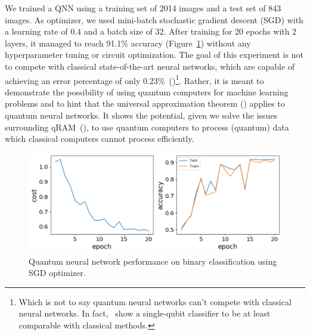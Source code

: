 \documentclass[a4paper,10pt]{article}
\begin{document}
We trained a QNN using a training set of 2014 images and a test set of 843 images.
As optimizer, we used mini-batch stochastic gradient descent (SGD) with a learning rate of $0.4$ and a batch size of $32$.
After training for 20 epochs with 2 layers, it managed to reach 91.1\% accuracy (Figure~\ref{fig:bdc-performance}) without any hyperparameter tuning or circuit optimization.
The goal of this experiment is not to compete with classical state-of-the-art neural networks, which are capable of achieving an error percentage of only 0.23\%~(\cite{cirecsan2012multi})\footnote{Which is not to say quantum neural networks can't compete with classical neural networks. In fact,~\cite{perez2019data} show a single-qubit classifier to be at least comparable with classical methods.}.
Rather, it is meant to demonstrate the possibility of using quantum computers for machine learning problems and to hint that the universal approximation theorem (\cite{csaji2001approximation}) applies to quantum neural networks.
It shows the potential, given we solve the issues surrounding qRAM~(\cite{aaronson2015read}), to use quantum computers to process (quantum) data which classical computers cannot process efficiently.
\begin{figure}[ht]
	\centering
	\includegraphics[width=.9\linewidth]{figures/downsampled_qnn.png}
	\caption{Quantum neural network performance on binary classification using SGD optimizer.}
	\label{fig:bdc-performance}
\end{figure}
\end{document}
